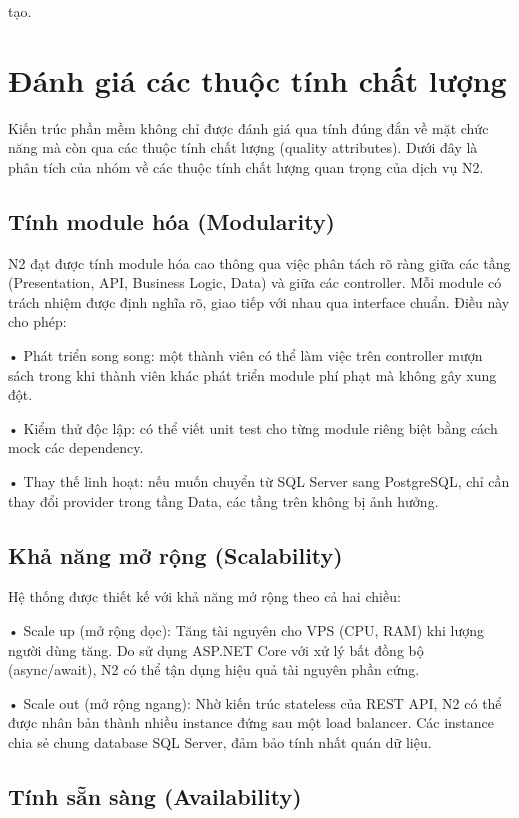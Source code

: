 tạo.

\section{Đánh giá các thuộc tính chất lượng}

Kiến trúc phần mềm không chỉ được đánh giá qua tính đúng đắn về mặt chức năng mà còn qua các thuộc tính chất lượng (quality attributes). Dưới đây là phân tích của nhóm về các thuộc tính chất lượng quan trọng của dịch vụ N2.

\subsection{Tính module hóa (Modularity)}

N2 đạt được tính module hóa cao thông qua việc phân tách rõ ràng giữa các tầng (Presentation, API, Business Logic, Data) và giữa các controller. Mỗi module có trách nhiệm được định nghĩa rõ, giao tiếp với nhau qua interface chuẩn. Điều này cho phép:

• Phát triển song song: một thành viên có thể làm việc trên controller mượn sách trong khi thành viên khác phát triển module phí phạt mà không gây xung đột.

• Kiểm thử độc lập: có thể viết unit test cho từng module riêng biệt bằng cách mock các dependency.

• Thay thế linh hoạt: nếu muốn chuyển từ SQL Server sang PostgreSQL, chỉ cần thay đổi provider trong tầng Data, các tầng trên không bị ảnh hưởng.

\subsection{Khả năng mở rộng (Scalability)}

Hệ thống được thiết kế với khả năng mở rộng theo cả hai chiều:

• Scale up (mở rộng dọc): Tăng tài nguyên cho VPS (CPU, RAM) khi lượng người dùng tăng. Do sử dụng ASP.NET Core với xử lý bất đồng bộ (async/await), N2 có thể tận dụng hiệu quả tài nguyên phần cứng.

• Scale out (mở rộng ngang): Nhờ kiến trúc stateless của REST API, N2 có thể được nhân bản thành nhiều instance đứng sau một load balancer. Các instance chia sẻ chung database SQL Server, đảm bảo tính nhất quán dữ liệu.

\subsection{Tính sẵn sàng (Availability)}

